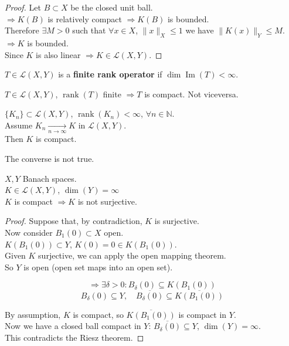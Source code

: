 \begin{proof}
Let $B \subset X$ be the closed unit ball. \\
$\Rightarrow K(B)$ is relatively compact $\Rightarrow K(B)$ is bounded. \\
Therefore $\exists M > 0$ such that $\forall x \in X$, $\|x\|_X \leq 1$ we have $\|K(x)\|_Y \leq M$. \\
$\Rightarrow K$ is bounded. \\
Since $K$ is also linear $\Rightarrow K \in \mathcal{L}(X, Y)$.
\end{proof}

\begin{definition}
$T \in \mathcal{L}(X, Y)$ is a \textbf{finite rank operator} if $\dim \operatorname{Im}(T) < \infty$.
\end{definition}

\begin{remark}
$T \in \mathcal{L}(X, Y)$, $\operatorname{rank}(T)$ finite $\Rightarrow T$ is compact. Not viceversa.
\end{remark}

\begin{theorem}
$\{K_n\} \subset \mathcal{L}(X, Y)$, $\operatorname{rank}(K_n) < \infty$, $\forall n \in \mathbb{N}$. \\
Assume $K_n \xrightarrow[n \to \infty]{} K$ in $\mathcal{L}(X, Y)$. \\
Then $K$ is compact.
\end{theorem}

\begin{remark}
The converse is not true.
\end{remark}

\begin{theorem}
$X, Y$ Banach spaces. \\
$K \in \mathcal{L}(X, Y)$, $\dim(Y) = \infty$ \\
$K$ is compact $\Rightarrow K$ is not surjective.
\end{theorem}

\begin{proof}
Suppose that, by contradiction, $K$ is surjective. \\
Now consider $B_1(0) \subset X$ open. \\
$K(B_1(0)) \subset Y$, $K(0) = 0 \in K(B_1(0))$. \\
Given $K$ surjective, we can apply the open mapping theorem. \\
So $Y$ is open (open set maps into an open set).

\[
\Rightarrow \exists \delta > 0 : B_\delta(0) \subseteq K(B_1(0))
\]
\[
B_\delta(0) \subseteq Y, \quad \overline{B_\delta(0)} \subseteq \overline{K(B_1(0))}
\]

By assumption, $K$ is compact, so $\overline{K(B_1(0))}$ is compact in $Y$. \\
Now we have a closed ball compact in $Y$: $\overline{B_\delta(0)} \subseteq Y$, $\dim(Y) = \infty$. \\
This contradicts the Riesz theorem.
\end{proof}

